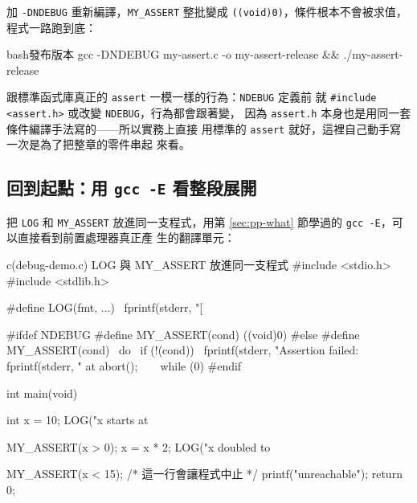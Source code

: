 加 \texttt{-DNDEBUG} 重新編譯，\texttt{MY\_ASSERT} 整批變成
\texttt{((void)0)}，條件根本不會被求值，程式一路跑到底：

\begin{code}{bash}{發布版本}
gcc -DNDEBUG my-assert.c -o my-assert-release && ./my-assert-release
\end{code}


跟標準函式庫真正的 \texttt{assert} 一模一樣的行為：\texttt{NDEBUG} 定義前
就 \texttt{\#include <assert.h>} 或改變 \texttt{NDEBUG}，行為都會跟著變，
因為 \texttt{assert.h} 本身也是用同一套條件編譯手法寫的——所以實務上直接
用標準的 \texttt{assert} 就好，這裡自己動手寫一次是為了把整章的零件串起
來看。

\subsection{回到起點：用 \texttt{gcc -E} 看整段展開}

把 \texttt{LOG} 和 \texttt{MY\_ASSERT} 放進同一支程式，用第
\ref{sec:pp-what} 節學過的 \texttt{gcc -E}，可以直接看到前置處理器真正產
生的翻譯單元：

\begin{example}{c}{(debug-demo.c) LOG 與 MY\_ASSERT 放進同一支程式}
#include <stdio.h>
#include <stdlib.h>

#define LOG(fmt, ...) \
    fprintf(stderr, "[%

#ifdef NDEBUG
    #define MY_ASSERT(cond) ((void)0)
#else
    #define MY_ASSERT(cond) \
        do { \
            if (!(cond)) { \
                fprintf(stderr, "Assertion failed: %
                fprintf(stderr, "  at %
                abort(); \
            } \
        } while (0)
#endif

int main(void) {
    int x = 10;
    LOG("x starts at %

    MY_ASSERT(x > 0);
    x = x * 2;
    LOG("x doubled to %

    MY_ASSERT(x < 15); /* 這一行會讓程式中止 */
    printf("unreachable\n");
    return 0;
}
\end{example}


